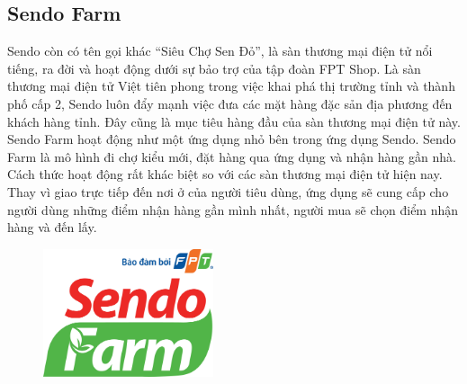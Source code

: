 \subsection{Sendo Farm}
\quad Sendo còn có tên gọi khác “Siêu Chợ Sen Đỏ”, là sàn thương mại điện tử nổi tiếng, ra đời và hoạt động dưới sự bảo trợ của tập đoàn FPT Shop. Là sàn thương mại điện tử Việt tiên phong trong việc khai phá thị trường tỉnh và thành phố cấp 2, Sendo luôn đẩy mạnh việc đưa các mặt hàng đặc sản địa phương đến khách hàng tỉnh. Đây cũng là mục tiêu hàng đầu của sàn thương mại điện tử này. 
Sendo Farm hoạt động như một ứng dụng nhỏ bên trong ứng dụng Sendo. Sendo Farm là mô hình đi chợ kiểu mới, đặt hàng qua ứng dụng và nhận hàng gần nhà. Cách thức hoạt động rất khác biệt so với các sàn thương mại điện tử hiện nay. Thay vì giao trực tiếp đến nơi ở của người tiêu dùng, ứng dụng sẽ cung cấp cho người dùng những điểm nhận hàng gần mình nhất, người mua sẽ chọn điểm nhận hàng và đến lấy. 

\begin{figure}[H]
\begin{center}
\includegraphics[width=5cm]{Images/sendo.png}
\end{center}
\end{figure}

